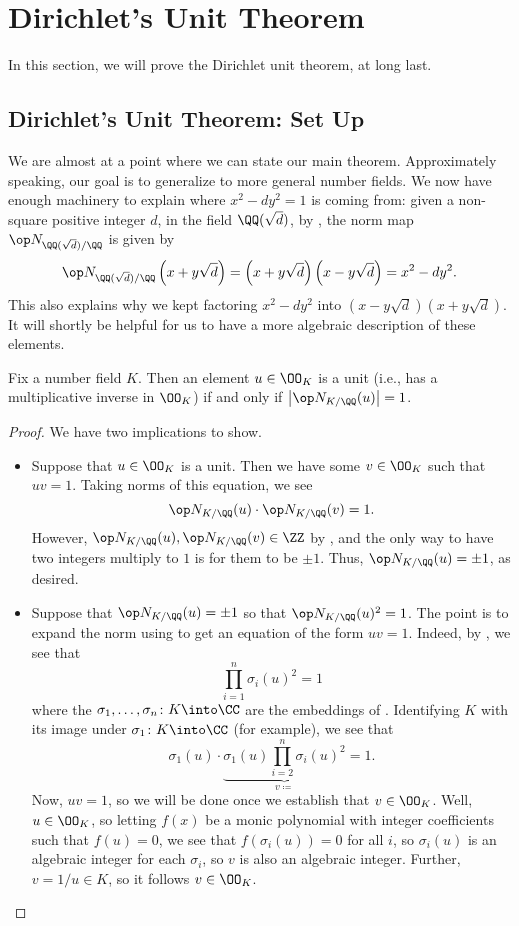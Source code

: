 \documentclass[../notes.tex]{subfiles}
\begin{document}
\section{Dirichlet's Unit Theorem}

In this section, we will prove the Dirichlet unit theorem, at long last.

\subsection{Dirichlet's Unit Theorem: Set Up}
We are almost at a point where we can state our main theorem. Approximately speaking, our goal is to generalize  to more general number fields. We now have enough machinery to explain where $x^2-dy^2=1$ is coming from: given a non-square positive integer $d$, in the field $\QQ(\sqrt d)$, by , the norm map $\op N_{\QQ(\sqrt d)/\QQ}$ is given by
\[\op N_{\QQ(\sqrt d)/\QQ}\left(x+y\sqrt d\right)=\left(x+y\sqrt d\right)\left(x-y\sqrt d\right)=x^2-dy^2.\]
This also explains why we kept factoring $x^2-dy^2$ into $\left(x-y\sqrt d\right)\left(x+y\sqrt d\right)$. It will shortly be helpful for us to have a more algebraic description of these elements.
\begin{lemma} \label{lem:unit-by-norm-one}
	Fix a number field $K$. Then an element $u\in\OO_K$ is a unit (i.e., has a multiplicative inverse in $\OO_K$) if and only if $\left|\op N_{K/\QQ}(u)\right|=1$.
\end{lemma}
\begin{proof}
	We have two implications to show.
	\begin{itemize}
		\item Suppose that $u\in\OO_K$ is a unit. Then we have some $v\in\OO_K$ such that $uv=1$. Taking norms of this equation, we see
		\[\op N_{K/\QQ}(u)\cdot\op N_{K/\QQ}(v)=1.\]
		However, $\op N_{K/\QQ}(u),\op N_{K/\QQ}(v)\in\ZZ$ by , and the only way to have two integers multiply to $1$ is for them to be $\pm1$. Thus, $\op N_{K/\QQ}(u)=\pm1$, as desired.
		\item Suppose that $\op N_{K/\QQ}(u)=\pm1$ so that $\op N_{K/\QQ}(u)^2=1$. The point is to expand the norm using  to get an equation of the form $uv=1$. Indeed, by , we see that
		\[\prod_{i=1}^n\sigma_i(u)^2=1\]
		where the $\sigma_1,\ldots,\sigma_n\colon K\into\CC$ are the embeddings of . Identifying $K$ with its image under $\sigma_1\colon K\into\CC$ (for example), we see that
		\[\sigma_1(u)\cdot\underbrace{\sigma_1(u)\prod_{i=2}^n\sigma_i(u)^2}_{v\coloneqq}=1.\]
		Now, $uv=1$, so we will be done once we establish that $v\in\OO_K$. Well, $u\in\OO_K$, so letting $f(x)$ be a monic polynomial with integer coefficients such that $f(u)=0$, we see that $f(\sigma_i(u))=0$ for all $i$, so $\sigma_i(u)$ is an algebraic integer for each $\sigma_i$, so $v$ is also an algebraic integer. Further, $v=1/u\in K$, so it follows $v\in\OO_K$.
		\qedhere
	\end{itemize}
\end{proof}
\end{document}
